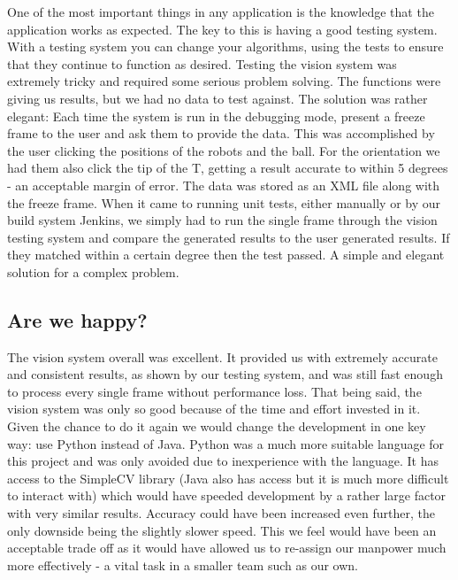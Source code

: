 One of the most important things in any application is the knowledge that the application works as expected. The key to this is having a good testing system. With a testing system you can change your algorithms, using the tests to ensure that they continue to function as desired. Testing the vision system was extremely tricky and required some serious problem solving. The functions were giving us results, but we had no data to test against. The solution was rather elegant: Each time the system is run in the debugging mode, present a freeze frame to the user and ask them to provide the data. This was accomplished by the user clicking the positions of the robots and the ball. For the orientation we had them also click the tip of the T, getting a result accurate to within 5 degrees - an acceptable margin of error. The data was stored as an XML file along with the freeze frame. When it came to running unit tests, either manually or by our build system Jenkins, we simply had to run the single frame through the vision testing system and compare the generated results to the user generated results. If they matched within a certain degree then the test passed. A simple and elegant solution for a complex problem. 

\subsection{Are we happy?}

The vision system overall was excellent. It provided us with extremely accurate and consistent results, as shown by our testing system, and was still fast enough to process every single frame without performance loss. That being said, the vision system was only so good because of the time and effort invested in it. Given the chance to do it again we would change the development in one key way: use Python instead of Java. Python was a much more suitable language for this project and was only avoided due to inexperience with the language. It has access to the SimpleCV library (Java also has access but it is much more difficult to interact with) which would have speeded development by a rather large factor with very similar results. Accuracy could have been increased even further, the only downside being the slightly slower speed. This we feel would have been an acceptable trade off as it would have allowed us to re-assign our manpower much more effectively - a vital task in a smaller team such as our own.






